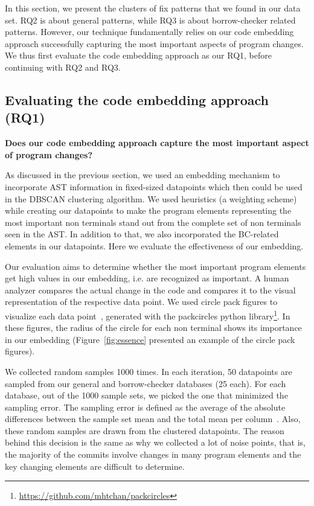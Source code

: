 In this section, we present the clusters of fix patterns that we found in our data set. RQ2 is about general patterns, while RQ3 is about borrow-checker related patterns. However, our technique fundamentally relies on our code embedding approach successfully capturing the most important aspects of program changes. We thus first evaluate the code embedding approach as our RQ1, before continuing with RQ2 and RQ3.

\subsection{Evaluating the code embedding approach (RQ1)}

\textbf{Does our code embedding approach capture the most important aspect of program changes?} 


As discussed in the previous section, we used an embedding mechanism to incorporate AST information in fixed-sized datapoints which then could be used in the DBSCAN clustering algorithm. We used heuristics (a weighting scheme) while creating our datapoints to make the program elements representing the most important non terminals stand out from the complete set of non terminals seen in the AST. In addition to that, we also incorporated the BC-related elements in our datapoints. Here we evaluate the effectiveness of our embedding.

Our evaluation aims to determine whether the most important program elements get high values in our embedding, i.e. are recognized as important. A human analyzer compares the actual change in the code and compares it to the visual representation of the respective data point. We used circle pack figures to visualize each data point~\citep{collins2003circle}, generated with the packcircles python library\footnote{\url{https://github.com/mhtchan/packcircles}}. In these figures, the radius of the circle for each non terminal shows its importance in our embedding (Figure~\ref{fig:essence} presented an example of the circle pack figures).

We collected random samples 1000 times. In each iteration, 50 datapoints are sampled from our general and borrow-checker databases (25 each). For each database, out of the 1000 sample sets, we picked the one that minimized the sampling error. The sampling error is defined as the average of the absolute differences between the sample set mean and the total mean per column~\citep{degroot2012probability}. Also, these random samples are drawn from the clustered datapoints. The reason behind this decision is the same as why we collected a lot of noise points, that is, the majority of the commits involve changes in many program elements and the key changing elements are difficult to determine.

